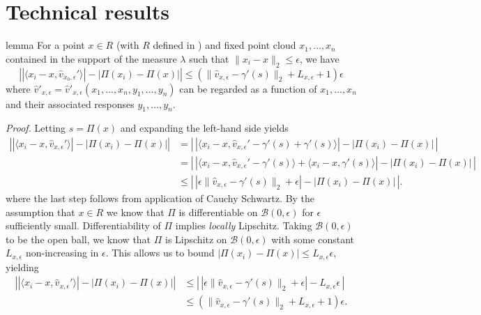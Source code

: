 \documentclass[11pt]{article}
\begin{document}
\section{Technical results}


\begin{restatable}{lemma}{} \label{lemma: projection error}
    For a point $x\in R$ (with $R$ defined in ) and fixed point cloud $x_1, \dots, x_n$ contained in the support of the measure $\lambda$ such that $\|x_i - x\|_2 \leq \epsilon$, we have
    \begin{equation}
        \left||\langle x_i - x, \hat{v}_{x_0, \epsilon}'\rangle| - |\Pi(x_i) - \Pi(x)| \right| \leq \left(\|\hat{v}_{x, \epsilon} - \gamma'(s)\|_2 + L_{x, \epsilon} + 1\right)\epsilon
    \end{equation}
    where $\hat{v}'_{x, \epsilon} = \hat{v}'_{x, \epsilon}(x_1, \dots, x_n, y_1, \dots, y_n)$ can be regarded as a function of $x_1, \dots, x_n$ and their associated responses $y_1, \dots, y_n$. 
\end{restatable}
\noindent \textit{Proof.} Letting $s = \Pi(x)$ and expanding the left-hand side yields
\begin{align*}
     \left||\langle x_i - x, \hat{v}_{x, \epsilon}'\rangle| - |\Pi(x_i) - \Pi(x)| \right| &=  \left|\,\left|\langle x_i - x, \hat{v}_{x, \epsilon}' - \gamma'(s) + \gamma'(s)\rangle\right| - \left|\Pi(x_i) - \Pi(x)\right|\, \right| \\
     &= \left|\, \left|\langle x_i - x, \hat{v}_{x, \epsilon}' - \gamma'(s)\rangle + \langle x_i - x, \gamma'(s)\rangle\right| - \left|\Pi(x_i) - \Pi(x)\right| \,\right| \\
     &\leq \left|\,\left|\epsilon\|\hat{v}_{x, \epsilon} - \gamma'(s)\|_2 + \epsilon\right| - |\Pi(x_i) - \Pi(x)| \,\right|.
\end{align*}
where the last step follows from application of Cauchy Schwartz. By the assumption that $x \in R$ we know that $\Pi$ is differentiable on $\mathcal{B}(0, \epsilon)$ for $\epsilon$ sufficiently small. Differentiability of $\Pi$ implies \textit{locally} Lipschitz. Taking $\mathcal{B}(0, \epsilon)$ to be the open ball, we know that $\Pi$ is Lipschitz on $\mathcal{B}(0, \epsilon)$ with some constant $L_{x, \epsilon}$ non-increasing in $\epsilon$. This allows us to bound $|\Pi(x_i) - \Pi(x)| \leq L_{x, \epsilon}\epsilon$, yielding
\begin{align*}
     \left||\langle x_i - x, \hat{v}_{x, \epsilon}'\rangle| - |\Pi(x_i) - \Pi(x)| \right| &\leq \left|\,\left|\epsilon\|\hat{v}_{x, \epsilon} - \gamma'(s)\|_2 + \epsilon\right| - L_{x,\epsilon}\epsilon \,\right| \\
     &\leq \left(\|\hat{v}_{x, \epsilon} - \gamma'(s)\|_2 + L_{x, \epsilon} + 1\right)\epsilon.
\end{align*}
\end{document}
